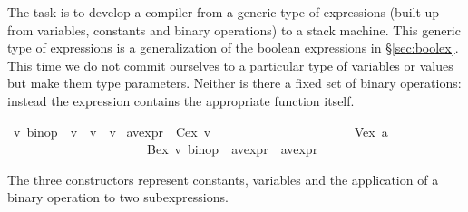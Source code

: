 %
\begin{isabellebody}%
\def\isabellecontext{CodeGen}%
%
%
\begin{isamarkuptext}%
\label{sec:ExprCompiler}
The task is to develop a compiler from a generic type of expressions (built
up from variables, constants and binary operations) to a stack machine.  This
generic type of expressions is a generalization of the boolean expressions in
\S\ref{sec:boolex}.  This time we do not commit ourselves to a particular
type of variables or values but make them type parameters.  Neither is there
a fixed set of binary operations: instead the expression contains the
appropriate function itself.%
\end{isamarkuptext}%
\ {\isacharprime}v\ binop\ {\isacharequal}\ {\isachardoublequote}{\isacharprime}v\ {\isasymRightarrow}\ {\isacharprime}v\ {\isasymRightarrow}\ {\isacharprime}v{\isachardoublequote}\isanewline
{}\ {\isacharparenleft}{\isacharprime}a{\isacharcomma}{\isacharprime}v{\isacharparenright}expr\ {\isacharequal}\ Cex\ {\isacharprime}v\isanewline
\ \ \ \ \ \ \ \ \ \ \ \ \ \ \ \ \ \ \ \ \ {\isacharbar}\ Vex\ {\isacharprime}a\isanewline
\ \ \ \ \ \ \ \ \ \ \ \ \ \ \ \ \ \ \ \ \ {\isacharbar}\ Bex\ {\isachardoublequote}{\isacharprime}v\ binop{\isachardoublequote}\ \ {\isachardoublequote}{\isacharparenleft}{\isacharprime}a{\isacharcomma}{\isacharprime}v{\isacharparenright}expr{\isachardoublequote}\ \ {\isachardoublequote}{\isacharparenleft}{\isacharprime}a{\isacharcomma}{\isacharprime}v{\isacharparenright}expr{\isachardoublequote}%
\begin{isamarkuptext}%
\noindent
The three constructors represent constants, variables and the application of
a binary operation to two subexpressions.


\end{isamarkuptext}
\end{isabellebody}
